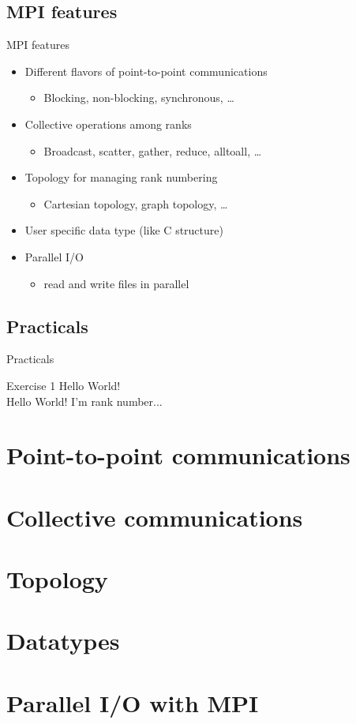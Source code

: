 \documentclass[aspectratio=43]{beamer}
\begin{document}
\subsection{MPI features}
\begin{frame}{MPI features}
\begin{itemize}
    \item Different flavors of point-to-point communications
    \begin{itemize}
        \item Blocking, non-blocking, synchronous, \ldots
    \end{itemize}
    \item Collective operations among ranks
    \begin{itemize}
        \item Broadcast, scatter, gather, reduce, alltoall, \ldots
    \end{itemize}
    \item Topology for managing rank numbering
    \begin{itemize}
        \item Cartesian topology, graph topology, \ldots
    \end{itemize}
    \item User specific data type (like C structure)
    \item Parallel I/O
    \begin{itemize}
        \item read and write files in parallel
    \end{itemize}
\end{itemize}
\end{frame}

\subsection{Practicals}
\begin{frame}{Practicals}
    \begin{brown2block}{Exercise 1}
        Hello World!\\
        Hello World! I'm rank number...
    \end{brown2block}
\end{frame}

\section{Point-to-point communications}
\section{Collective communications}
\section{Topology}
\section{Datatypes}
\section{Parallel I/O with MPI}

\end{document}
